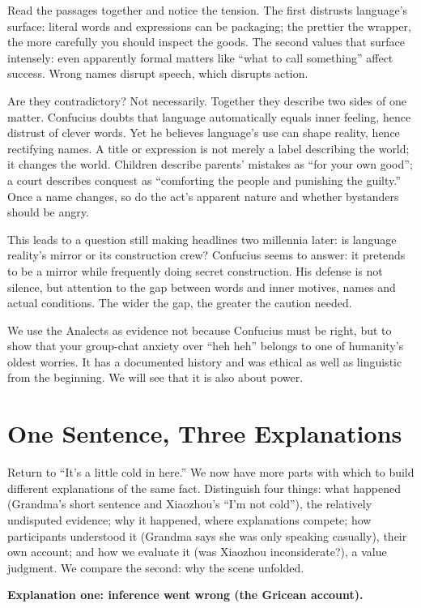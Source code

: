 Read the passages together and notice the tension. The first distrusts language's surface: literal words and expressions can be packaging; the prettier the wrapper, the more carefully you should inspect the goods. The second values that surface intensely: even apparently formal matters like ``what to call something'' affect success. Wrong names disrupt speech, which disrupts action.

Are they contradictory? Not necessarily. Together they describe two sides of one matter. Confucius doubts that language automatically equals inner feeling, hence distrust of clever words. Yet he believes language's use can shape reality, hence rectifying names. A title or expression is not merely a label describing the world; it changes the world. Children describe parents' mistakes as ``for your own good''; a court describes conquest as ``comforting the people and punishing the guilty.'' Once a name changes, so do the act's apparent nature and whether bystanders should be angry.

This leads to a question still making headlines two millennia later: is language reality's mirror or its construction crew? Confucius seems to answer: it pretends to be a mirror while frequently doing secret construction. His defense is not silence, but attention to the gap between words and inner motives, names and actual conditions. The wider the gap, the greater the caution needed.

We use the Analects as evidence not because Confucius must be right, but to show that your group-chat anxiety over ``heh heh'' belongs to one of humanity's oldest worries. It has a documented history and was ethical as well as linguistic from the beginning. We will see that it is also about power.

\section{One Sentence, Three Explanations}
Return to ``It's a little cold in here.'' We now have more parts with which to build different explanations of the same fact. Distinguish four things: what happened (Grandma's short sentence and Xiaozhou's ``I'm not cold''), the relatively undisputed evidence; why it happened, where explanations compete; how participants understood it (Grandma says she was only speaking casually), their own account; and how we evaluate it (was Xiaozhou inconsiderate?), a value judgment. We compare the second: why the scene unfolded.

\textbf{Explanation one: inference went wrong (the Gricean account).}

